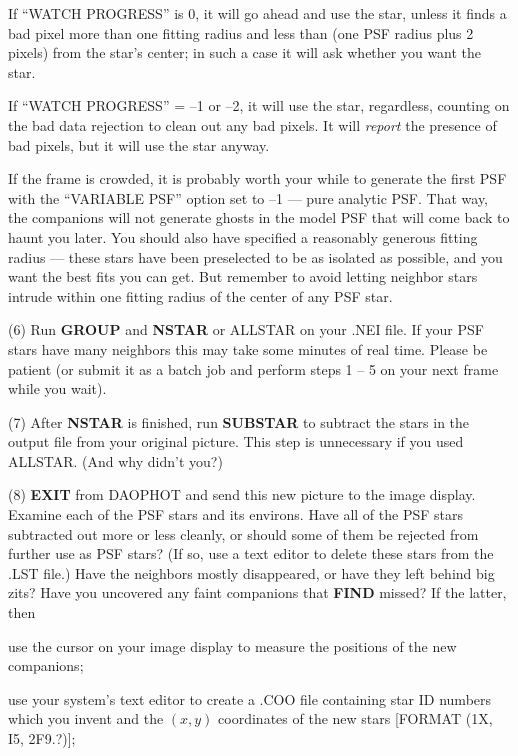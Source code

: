  If ``WATCH PROGRESS'' is 0, it will go ahead and use the
star, unless it finds a bad pixel more than one fitting radius and less
than (one PSF radius plus 2 pixels) from the star's center; in such a
case it will ask whether you want the star.

 If ``WATCH PROGRESS'' = --1 or --2, it will use the
star, regardless, counting on the bad data rejection to clean out any
bad pixels.  It will {\it report\/} the presence of bad pixels, but it
will use the star anyway.

\item{} If the frame is crowded, it is probably worth your while to
generate the first PSF with the ``VARIABLE PSF'' option set to --1 ---
pure analytic PSF.  That way, the companions will not generate ghosts
in the model PSF that will come back to haunt you later.  You should
also have specified a reasonably generous fitting radius --- these
stars have been preselected to be as isolated as possible, and you want
the best fits you can get.  But remember to avoid letting neighbor
stars intrude within one fitting radius of the center of any PSF star.

\item{(6)} Run {\bf GROUP} and {\bf NSTAR} or ALLSTAR on your
.NEI file.  If your PSF stars have many neighbors this may take some
minutes of real time.  Please be patient (or submit it as a batch
job and perform steps 1 -- 5 on your next frame while you wait).

\item{(7)} After {\bf NSTAR} is finished, run {\bf SUBSTAR} to
subtract the stars in the output file from your original picture.  
This step is unnecessary if you used ALLSTAR. (And why didn't 
you?)

\item{(8)} {\bf EXIT} from DAOPHOT and send this new picture to the
image display. Examine each of the PSF stars and its environs.  Have
all of the PSF stars subtracted out more or less cleanly, or should
some of them be rejected from further use as PSF stars?  (If so, use 
a text editor to delete these stars from the .LST file.)  Have the
neighbors mostly disappeared, or have they left behind big zits?  Have
you uncovered any faint companions that {\bf FIND} missed?  If the
latter, then

 use the cursor on your image display to measure the
positions of the new companions;

 use your system's text editor to create a .COO file
containing star ID numbers which you invent and the $(x,y)$ coordinates
of the new stars [FORMAT (1X, I5, 2F9.?)];

